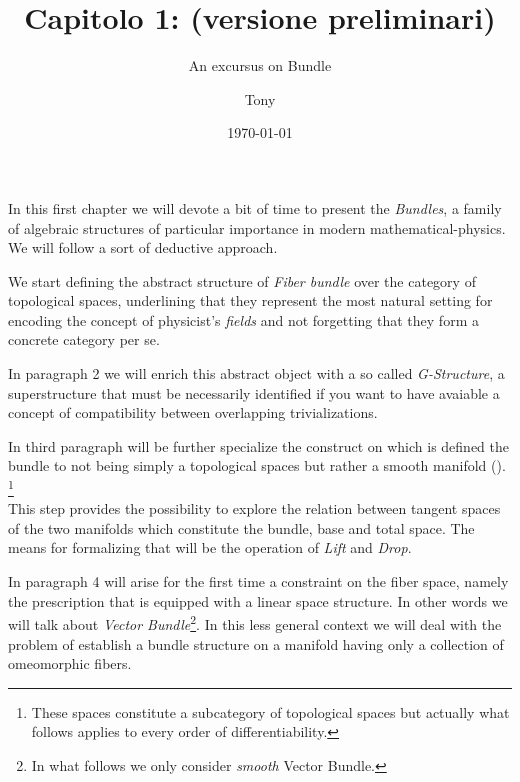 \documentclass[a4paper,12pt]{scrartcl}    %
\begin{document}
	\title{Capitolo 1: (versione preliminari)}
	\subtitle{An excursus on Bundle}
	\author{Tony}
	\date{\today}
\maketitle





\tableofcontents


\newpage



In this first chapter we will devote a bit of time to present the \emph{Bundles}, a family of algebraic structures of particular importance in modern mathematical-physics.
\\
We will follow a sort of deductive approach.

We start defining the abstract structure of \emph{Fiber bundle} over the category of topological spaces, underlining that they represent the most natural setting for encoding the concept of physicist's \emph{fields} and not forgetting that they form a concrete category per se.

In paragraph 2 we will enrich this abstract object with a so called \emph{G-Structure}, a superstructure that must be necessarily identified if you want to have avaiable a concept of compatibility between overlapping trivializations.

In third paragraph will be further specialize the construct on which is defined the bundle to not being simply a topological spaces but rather a smooth manifold (). \footnote{These spaces constitute a subcategory of topological spaces but actually what follows applies to every order of differentiability.}
\\
This step provides the possibility to explore the relation between tangent spaces of the two manifolds which constitute the bundle, base and total space. The means for formalizing that will be the operation of \emph{Lift} and \emph{Drop}.

In paragraph 4 will arise for the first time a constraint on the fiber space, namely the prescription that is equipped with a linear space structure. In other words we will talk about \emph{Vector Bundle}\footnote{In what follows we only consider \emph{smooth} Vector Bundle.}.
In this less general context we will deal with the problem of establish a bundle structure on a manifold having only a collection of omeomorphic fibers.
\end{document}
